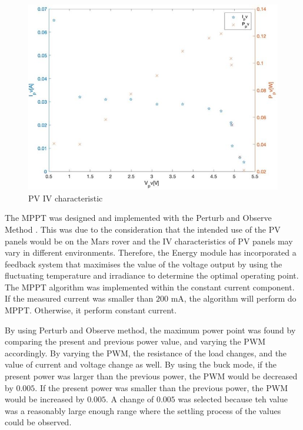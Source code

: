 \documentclass[11pt, a4paper]{article}
\begin{document}
\begin{figure} [h!]
    \centering
    \includegraphics[scale=0.6]{Energy_PV_characteristic.JPG}
    \caption{PV IV characteristic}
    \label{fig:IV_char}
\end{figure}

The MPPT was designed and implemented with the Perturb and Observe Method \cite{PV_current}. This was due to the consideration that the intended use of the PV panels would be on the Mars rover and the IV characteristics of PV panels may vary in different environments. Therefore, the Energy module has incorporated a feedback system that maximises the value of the voltage output by using the fluctuating temperature and irradiance to determine the optimal operating point. The MPPT algorithm was implemented within the constant current component. If the measured current was smaller than $200$ mA, the algorithm will perform do MPPT. Otherwise, it perform constant current.

By using Perturb and Observe method, the maximum power point was found by comparing the present and previous power value, and varying the PWM accordingly. By varying the PWM, the resistance of the load changes, and the value of current and voltage change as well. By using the buck mode, if the present power was larger than the previous power, the PWM would be decreased by $0.005$. If the present power was smaller than the previous power, the PWM would be increased by $0.005$. A change of $0.005$ was selected because teh value was a reasonably large enough range where the settling process of the values could be observed.

\pagebreak
\end{document}
